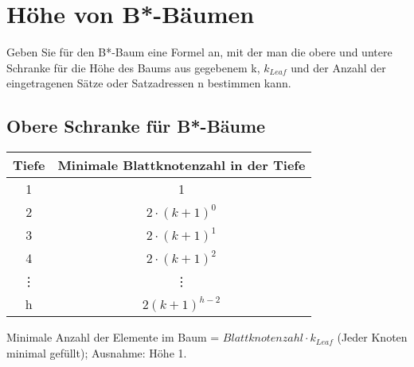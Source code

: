 \section{Höhe von B*-Bäumen}
Geben Sie für den B*-Baum eine Formel an, mit der man die obere und untere Schranke für die Höhe des Baums aus gegebenem k, $k_{Leaf}$ und der Anzahl der eingetragenen Sätze oder Satzadressen n bestimmen kann.

\begin{note}
\subsection*{Obere Schranke für B*-Bäume}
\begin{tabular}{cc}
	Tiefe & Minimale Blattknotenzahl in der Tiefe \\
	\hline
	1 & 1 \\
	\hline
	2 & $2\cdot (k+1)^0$ \\
	\hline
	3 & $2\cdot (k+1)^1$ \\
	\hline
	4 & $2\cdot(k+1)^2$ \\
	\hline
	\vdots & \vdots \\
	\hline
	h & $2(k+1)^{h-2}$ \\
	\hline
\end{tabular}

Minimale Anzahl der Elemente im Baum = $Blattknotenzahl \cdot k_{Leaf}$ (Jeder Knoten minimal gefüllt); Ausnahme: Höhe 1.


\end{note}
